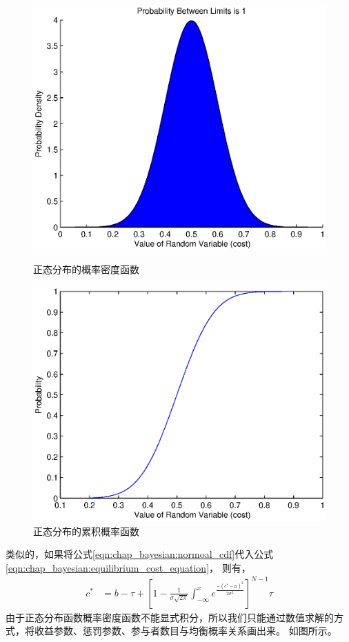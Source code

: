 \begin{figure}[tb] 
  \begin{minipage}[t]{0.5\linewidth} 
    \centering 
    \includegraphics[width = \textwidth]{bayesian_normal_density_scheme.eps} 
    \caption{正态分布的概率密度函数} 
    \label{fig:chap_bayesian:normal_density_scheme} 
  \end{minipage}%
  \begin{minipage}[t]{0.5\linewidth} 
    \centering 
    \includegraphics[width=\textwidth]{bayesian_normal_cdf_scheme.eps} 
    \caption{正态分布的累积概率函数} 
    \label{fig:chap_bayesian:normal_cdf_schem} 
  \end{minipage} 
\end{figure}
类似的，如果将公式\ref{eqn:chap_bayesian:normoal_cdf}代入公式\ref{eqn:chap_bayesian:equilibrium_cost_equation}，
则有，
\begin{align} 
    c^* &= b - \tau + \left[ 1-\frac{1}{\sigma \sqrt{2\pi} } \int^x_{-\infty}e^{ \frac{-(c^*-\mu)^2}{2\sigma^2}} \right] ^{N-1}\tau
    \label{eqn:chap_bayesian:cost_normal_distribution_equation}
\end{align}
由于正态分布函数概率密度函数不能显式积分，所以我们只能通过数值求解的方式，将收益参数、惩罚参数、参与者数目与均衡概率关系画出来。
如图所示。
